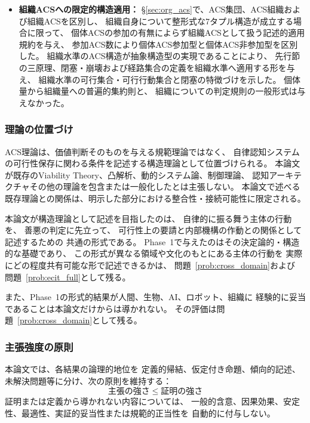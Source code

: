\begin{itemize}
  \item \textbf{組織ACSへの限定的構造適用：}
  \S\ref{sec:org_acs}で、ACS集団、ACS組織および組織ACSを区別し、
  組織自身について整形式な7タプル構造が成立する場合に限って、
  個体ACSの参加の有無によらず組織ACSとして扱う記述的適用規約を与え、
  参加ACS数により個体ACS参加型と個体ACS非参加型を区別した。
  組織水準のACS構造が抽象構造型の実現であることにより、
  先行節の三原理、閉塞・崩壊および経路集合の定義を組織水準へ適用する形を与え、
  組織水準の可行集合・可行行動集合と閉塞の特徴づけを示した。
  個体量から組織量への普遍的集約則と、
  組織についての判定規則の一般形式は与えなかった。
\end{itemize}

\subsubsection*{理論の位置づけ}
\label{subsubsec:positioning}

ACS理論は、価値判断そのものを与える規範理論ではなく、
自律認知システムの可行性保存に関わる条件を記述する構造理論として位置づけられる。
本論文が既存のViability Theory、凸解析、動的システム論、制御理論、
認知アーキテクチャその他の理論を包含または一般化したとは主張しない。
本論文で述べる既存理論との関係は、明示した部分における整合性・接続可能性に限定される。

本論文が構造理論として記述を目指したのは、
自律的に振る舞う主体の行動を、
善悪の判定に先立って、
可行性上の要請と内部機構の作動との関係として記述するための
共通の形式である。
Phase~1で与えたのはその決定論的・構造的な基礎であり、
この形式が異なる領域や文化のもとにある主体の行動を
実際にどの程度共有可能な形で記述できるかは、
問題~\ref{prob:cross_domain}および
問題~\ref{prob:ecit_full}として残る。

また、Phase~1の形式的結果が人間、生物、AI、ロボット、組織に
経験的に妥当であることは本論文だけからは導かれない。
その評価は問題~\ref{prob:cross_domain}として残る。

\subsubsection*{主張強度の原則}
\label{subsubsec:principle_check}

本論文では、各結果の論理的地位を
定義的帰結、仮定付き命題、傾向的記述、
未解決問題等に分け、次の原則を維持する：
\[
  \text{主張の強さ}\;\leq\;\text{証明の強さ}
\]
証明または定義から導かれない内容については、
一般的含意、因果効果、安定性、最適性、実証的妥当性または規範的正当性を
自動的に付与しない。

